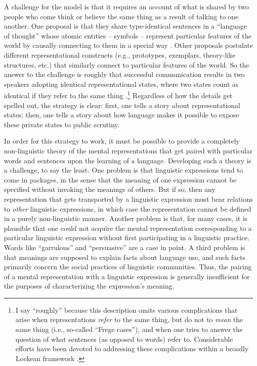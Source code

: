 A challenge for the model is that it requires an account of what is shared by two people who come think or believe the same thing as a result of talking to one another. One proposal is that they share type-identical sentences in a ``language of thought'' whose atomic entities -- symbols -- represent particular features of the world by causally connecting to them in a special way \citep{Fodor:1998}. Other proposals postulate different representational constructs (e.g., prototypes, exemplars, theory-like structures, etc.) that similarly connect to particular features of the world. So the answer to the challenge is roughly that successful communication results in two speakers adopting identical representational states, where two states count as identical if they refer to the same thing \citep{Fodor:1998}.\footnote{I say ``roughly'' because this description omits various complications that arise when representations \textit{refer} to the same thing, but do not to \textit{mean} the same thing (i.e., so-called ``Frege cases''), and when one tries to answer the question of what sentences (as opposed to words) refer to. Considerable efforts have been devoted to addressing these complications within a broadly Lockean framework \citep[see e.g.,][]{Speaks:2014}.} Regardless of how the details get spelled out, the strategy is clear: first, one tells a story about representational states; then, one tells a story about how language makes it possible to expose these private states to public scrutiny. 

In order for this strategy to work, it must be possible to provide a completely non-linguistic theory of the mental representations that get paired with particular words and sentences upon the learning of a language. Developing such a theory is a challenge, to say the least. One problem is that linguistic expressions tend to come in packages, in the sense that the meaning of one expression cannot be specified without invoking the meanings of others. But if so, then any representation that gets transported by a linguistic expression must bear relations to \textit{other} linguistic expressions, in which case the representation cannot be defined in a purely non-linguistic manner. Another problem is that, for many cases, it is plausible that one could not acquire the mental representation corresponding to a particular linguistic expression without first participating in a linguistic practice. Words like ``garrulous'' and ``persuasive'' are a case in point. A third problem is that meanings are supposed to explain facts about language use, and such facts primarily concern the social practices of linguistic communities. Thus, the pairing of a mental representation with a linguistic expression is generally insufficient for the purposes of characterizing the expression's meaning. 

